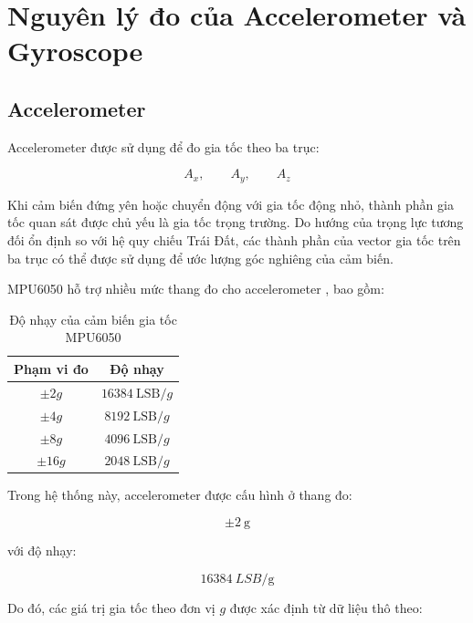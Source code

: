 \section{Nguyên lý đo của Accelerometer và Gyroscope}
\label{sec:sensor-principle}

\subsection{Accelerometer}

Accelerometer được sử dụng để đo gia tốc theo ba trục:

\begin{equation}
A_x,\qquad A_y,\qquad A_z
\end{equation}

Khi cảm biến đứng yên hoặc chuyển động với gia tốc động nhỏ, thành phần gia tốc quan sát được chủ yếu là gia tốc trọng trường. Do hướng của trọng lực tương đối ổn định so với hệ quy chiếu Trái Đất, các thành phần của vector gia tốc trên ba trục có thể được sử dụng để ước lượng góc nghiêng của cảm biến.

MPU6050 hỗ trợ nhiều mức thang đo cho accelerometer \cite{mpu6050-datasheet}, bao gồm:

\begin{table}[H]
\centering
\renewcommand{\arraystretch}{1.3}
\begin{tabular}{|c|c|}
\hline
\textbf{Phạm vi đo} & \textbf{Độ nhạy} \\ \hline
$\pm 2g$  & $16384\ \text{LSB}/g$ \\ \hline
$\pm 4g$  & $8192\ \text{LSB}/g$ \\ \hline
$\pm 8g$  & $4096\ \text{LSB}/g$ \\ \hline
$\pm 16g$ & $2048\ \text{LSB}/g$ \\ \hline
\end{tabular}
\caption{Độ nhạy của cảm biến gia tốc MPU6050}
\label{tab:mpu6050_accel_sensitivity}
\end{table}

Trong hệ thống này, accelerometer được cấu hình ở thang đo:

\begin{equation}
\pm \qty{2}{\g}
\end{equation}

với độ nhạy:

\begin{equation}
\qty{16384}{LSB/\g}
\end{equation}

Do đó, các giá trị gia tốc theo đơn vị $g$ được xác định từ dữ liệu
thô theo:


